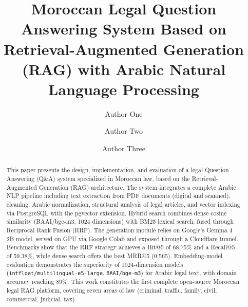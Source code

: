 \documentclass[runningheads]{llncs}
\begin{document}
\title{Moroccan Legal Question Answering System Based on Retrieval-Augmented
Generation (RAG) with Arabic Natural Language Processing}

\author{Author One
        \and
        Author Two
        \and
        Author Three}


\maketitle

\begin{abstract}
This paper presents the design, implementation, and evaluation of a legal
Question Answering (Q\&A) system specialized in Moroccan law, based on the
Retrieval-Augmented Generation (RAG) architecture. The system integrates a
complete Arabic NLP pipeline including text extraction from PDF documents
(digital and scanned), cleaning, Arabic normalization, structural analysis of
legal articles, and vector indexing via PostgreSQL with the pgvector
extension. Hybrid search combines dense cosine similarity (BAAI/bge-m3, 1024
dimensions) with BM25 lexical search, fused through Reciprocal Rank Fusion
(RRF). The generation module relies on Google's Gemma 4 2B model, served on
GPU via Google Colab and exposed through a Cloudflare tunnel. Benchmarks show
that the RRF strategy achieves a Hit@5 of 68.75\% and a Recall@5 of 59.38\%,
while dense search offers the best MRR@5 (0.565). Embedding-model evaluation
demonstrates the superiority of 1024-dimension models
(\texttt{intfloat/multilingual-e5-large}, \texttt{BAAI/bge-m3}) for Arabic
legal text, with domain accuracy reaching 89\%. This work constitutes the
first complete open-source Moroccan legal RAG platform, covering seven areas
of law (criminal, traffic, family, civil, commercial, judicial, tax).
\end{abstract}












\end{document}
